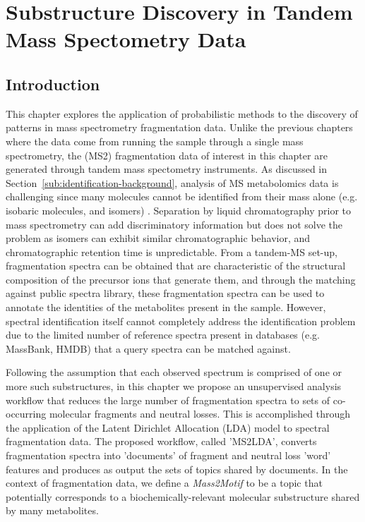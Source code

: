 \chapter{Substructure Discovery in Tandem Mass Spectometry Data}
\label{c:background}

\section{Introduction}

This chapter explores the application of probabilistic methods to the discovery of patterns in mass spectrometry fragmentation data. Unlike the previous chapters where the data come from running the sample through a single mass spectrometry, the (MS2) fragmentation data of interest in this chapter are generated through tandem mass spectometry instruments. As discussed in Section~\ref{sub:identification-background}, analysis of MS metabolomics data is challenging since many molecules cannot be identified from their mass alone (e.g. isobaric molecules, and isomers) \cite{VanderHooft2013, Kind2006}. Separation by liquid chromatography prior to mass spectrometry can add discriminatory information but does not solve the problem as isomers can exhibit similar chromatographic behavior, and chromatographic retention time is unpredictable. From a tandem-MS set-up, fragmentation spectra can be obtained that are characteristic of the structural composition of the precursor ions that generate them, and through the matching against public spectra library, these fragmentation spectra can be used to annotate the identities of the metabolites present in the sample. However, spectral identification itself cannot completely address the identification problem due to the limited number of reference spectra present in databases (e.g. MassBank, HMDB) that a query spectra can be matched against. 

Following the assumption that each observed spectrum is comprised of one or more such substructures, in this chapter we propose an unsupervised analysis workflow that reduces the large number of fragmentation spectra to sets of co-occurring molecular fragments and neutral losses. This is accomplished through the application of the Latent Dirichlet Allocation (LDA) model to spectral fragmentation data. The proposed workflow, called 'MS2LDA', converts fragmentation spectra into 'documents' of fragment and neutral loss 'word' features and produces as output the sets of topics shared by documents. In the context of fragmentation data, we define a \textit{Mass2Motif} to be a topic that potentially corresponds to a biochemically-relevant molecular substructure shared by many metabolites. 

